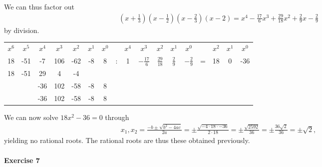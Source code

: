 \documentclass{article}
\begin{document}
We can thus factor out
\begin{align*}
    \left(x + \frac{1}{3}\right)\left(x - \frac{1}{2}\right)\left(x - \frac{2}{3}\right)(x - 2) = x^4-\frac{17}{6}x^3+\frac{29}{18}x^2+\frac{2}{9}x-\frac{2}{9}
\end{align*}
by division.

\begin{center}
    \begin{tabular}{ccccccc c ccccc c ccc}
        $x^6$&$x^5$&$x^4$&$x^3$&$x^2$&$x^1$&$x^0$&&$x^4$&$x^3$&$x^2$&$x^1$&$x^0$&&$x^2$&$x^1$&$x^0$ \\
        18&-51&-7&106&-62&-8&8&:&1&$-\frac{17}{6}$&$\frac{29}{18}$&$\frac{2}{9}$&$-\frac{2}{9}$&=&18&0&-36 \\
        18&-51&29&4&-4&&&&&&&&&&&& \\\cmidrule{1-5}
        &&-36&102&-58&-8&8&&&&&&&&& \\
        &&-36&102&-58&-8&8\\\cmidrule{3-7}
    \end{tabular}
\end{center}

We can now solve $18x^2 - 36 = 0$ through
\begin{align*}
    x_1,x_2 = \frac{-b \pm \sqrt{b^2 - 4ac}}{2a} =
    \pm\frac{\sqrt{-4 \cdot 18 \cdot -36}}{2 \cdot 18} =
    \pm\frac{\sqrt{2592}}{36} =
    \pm\frac{36\sqrt{2}}{36} = \pm \sqrt{2},
\end{align*}
yielding no rational roots. The rational roots are thus these obtained previously.

\pagebreak
\paragraph{Exercise 7}
\end{document}
